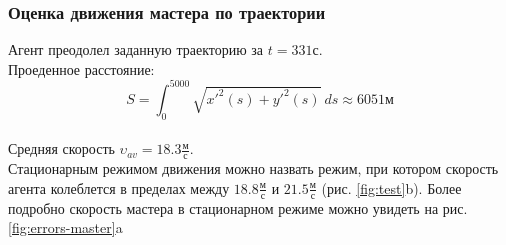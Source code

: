 \documentclass[a4paper, 14pt]{extarticle}
\let\Oldsubsubsection\subsubsection
\renewcommand{\subsubsection}{\FloatBarrier\Oldsubsubsection}
\begin{document}
\subsubsection{Оценка движения мастера по траектории}
Агент преодолел заданную траекторию за $t = 331 \text{с}$. \\
Проеденное расстояние:
$$ S = \int_{0}^{5000} \sqrt{x'^2(s) + y'^2(s)} \ ds \approx 6051 \text{м} $$ \\
Средняя скорость $\upsilon_{av} = 18.3  \frac{\text{м}}{\text{с}}$. \\
Стационарным режимом движения можно назвать режим, при котором скорость агента колеблется в пределах между $18.8\frac{\text{м}}{\text{с}}$ и $21.5\frac{\text{м}}{\text{с}}$ (рис. \ref{fig:test}b). Более подробно скорость мастера в стационарном режиме можно увидеть на рис. \ref{fig:errors-master}a \\
\end{document}
